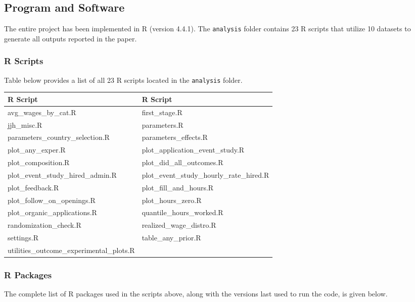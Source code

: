 \documentclass[10pt]{article}
\newenvironment{eightpt}{\begingroup\fontsize{8}{12.5}\selectfont}{\endgroup}
\begin{document}
\subsection{Program and Software}
The entire project has been implemented in R (version 4.4.1). The \texttt{analysis} folder contains 23 R scripts that utilize 10 datasets to generate all outputs reported in the paper.

\subsubsection{R Scripts}
Table below provides a list of all 23 R scripts located in the \texttt{analysis} folder.

\begin{eightpt}
\begin{tabularx}{\textwidth}{TT}
\toprule
R Script & R Script \\
\midrule
avg\_wages\_by\_cat.R & first\_stage.R \\
jjh\_misc.R & parameters.R \\
parameters\_country\_selection.R & parameters\_effects.R \\
plot\_any\_exper.R & plot\_application\_event\_study.R \\
plot\_composition.R & plot\_did\_all\_outcomes.R \\
plot\_event\_study\_hired\_admin.R & plot\_event\_study\_hourly\_rate\_hired.R \\
plot\_feedback.R & plot\_fill\_and\_hours.R \\
plot\_follow\_on\_openings.R & plot\_hours\_zero.R \\
plot\_organic\_applications.R & quantile\_hours\_worked.R \\
randomization\_check.R & realized\_wage\_distro.R \\
settings.R & table\_any\_prior.R \\
utilities\_outcome\_experimental\_plots.R & \\
\bottomrule
\end{tabularx}
\end{eightpt}

\subsubsection{R Packages}
The complete list of R packages used in the scripts above, along with the versions last used to run the code, is given below.
\end{document}
